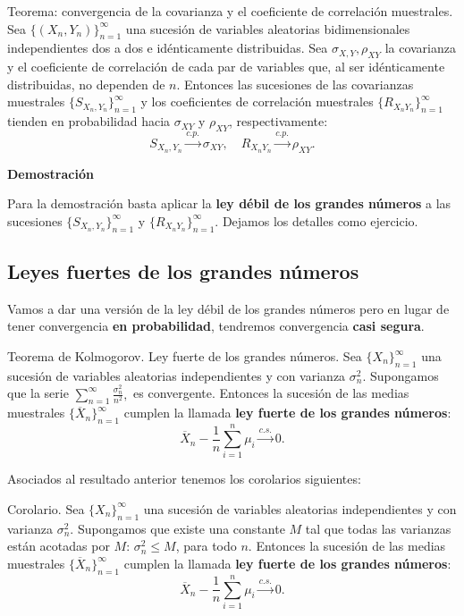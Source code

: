 \documentclass[]{book}
\begin{document}
 Teorema: convergencia de la covarianza y el coeficiente de correlación muestrales.
Sea \(\{(X_n,Y_n)\}_{n=1}^\infty\) una sucesión de variables aleatorias bidimensionales independientes dos a dos e idénticamente distribuidas.
Sea \(\sigma_{X,Y}, \rho_{XY}\) la covarianza y el coeficiente de correlación de cada par de variables que, al ser idénticamente distribuidas, no dependen de \(n\). Entonces las sucesiones de las covarianzas muestrales \(\{S_{X_n,Y_n}\}_{n=1}^\infty\) y los coeficientes de correlación muestrales \(\{R_{X_nY_n}\}_{n=1}^\infty\) tienden en probabilidad hacia \(\sigma_{XY}\) y \(\rho_{XY}\), respectivamente:
\[
S_{X_n,Y_n}\stackrel{c.p.}{\longrightarrow}\sigma_{XY},\quad R_{X_nY_n}\stackrel{c.p.}{\longrightarrow}\rho_{XY}.
\]

\textbf{Demostración}

Para la demostración basta aplicar la \textbf{ley débil de los grandes números} a las sucesiones \(\{S_{X_n,Y_n}\}_{n=1}^\infty\) y \(\{R_{X_nY_n}\}_{n=1}^\infty\). Dejamos los detalles como ejercicio.

\hypertarget{leyes-fuertes-de-los-grandes-nuxfameros}{%
\subsection{Leyes fuertes de los grandes números}\label{leyes-fuertes-de-los-grandes-nuxfameros}}

Vamos a dar una versión de la ley débil de los grandes números pero en lugar de tener convergencia \textbf{en probabilidad}, tendremos convergencia \textbf{casi segura}.

 Teorema de Kolmogorov. Ley fuerte de los grandes números.
Sea \(\{X_n\}_{n=1}^\infty\) una sucesión de variables aleatorias independientes y con varianza \(\sigma_n^2\). Supongamos que la serie
\(\sum\limits_{n=1}^\infty \frac{\sigma_n^2}{n^2},\)
es convergente. Entonces la sucesión de las medias muestrales \(\{\overline{X}_n\}_{n=1}^\infty\) cumplen la
llamada \textbf{ley fuerte de los grandes números}:
\[
\overline{X}_n-\frac{1}{n}\sum_{i=1}^n \mu_i \stackrel{c.s.}{\longrightarrow} 0.
\]

Asociados al resultado anterior tenemos los corolarios siguientes:

 Corolario.
Sea \(\{X_n\}_{n=1}^\infty\) una sucesión de variables aleatorias independientes y con varianza \(\sigma_n^2\). Supongamos que existe una constante \(M\) tal que todas las varianzas están acotadas por \(M\): \(\sigma_n^2\leq M\), para todo \(n\).
Entonces la sucesión de las medias muestrales \(\{\overline{X}_n\}_{n=1}^\infty\) cumplen la
llamada \textbf{ley fuerte de los grandes números}:
\[
\overline{X}_n-\frac{1}{n}\sum_{i=1}^n \mu_i \stackrel{c.s.}{\longrightarrow} 0.
\]
\end{document}
